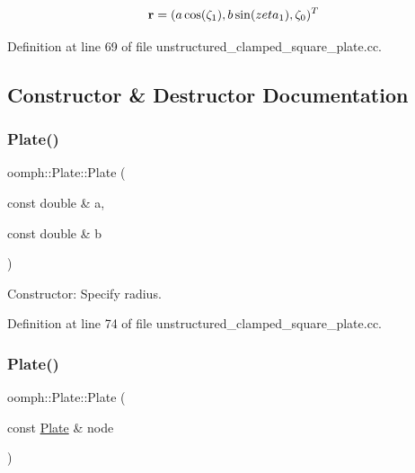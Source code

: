 \[ {\bf r} = ( a \cos(\zeta_1), b \sin(zeta_1), \zeta_0)^T \] 

Definition at line 69 of file unstructured\+\_\+clamped\+\_\+square\+\_\+plate.\+cc.



\subsection{Constructor \& Destructor Documentation}
\mbox{\label{classoomph_1_1Plate_a61811f7521511ed6e82758d050fa8d69}} 
\subsubsection{\texorpdfstring{Plate()}{Plate()}\hspace{0.1cm}{\footnotesize\ttfamily [1/2]}}
{\footnotesize\ttfamily oomph\+::\+Plate\+::\+Plate (\begin{DoxyParamCaption}\item[{const double \&}]{a,  }\item[{const double \&}]{b }\end{DoxyParamCaption})\hspace{0.3cm}{\ttfamily [inline]}}



Constructor\+: Specify radius. 



Definition at line 74 of file unstructured\+\_\+clamped\+\_\+square\+\_\+plate.\+cc.

\mbox{\label{classoomph_1_1Plate_a18b86a428438bed97cb98e9e138b9404}} 
\subsubsection{\texorpdfstring{Plate()}{Plate()}\hspace{0.1cm}{\footnotesize\ttfamily [2/2]}}
{\footnotesize\ttfamily oomph\+::\+Plate\+::\+Plate (\begin{DoxyParamCaption}\item[{const \hyperlink{classoomph_1_1Plate}{Plate} \&}]{node }\end{DoxyParamCaption})\hspace{0.3cm}{\ttfamily [inline]}}



